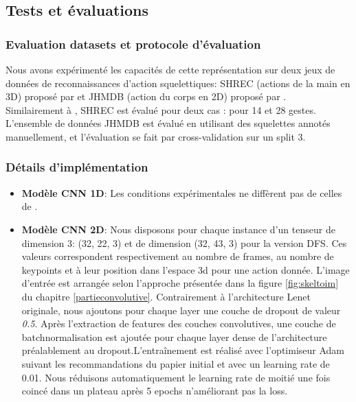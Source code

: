 \subsection{Tests et évaluations}
\label{JHMDBSHREC}
\subsubsection{Evaluation datasets et protocole d'évaluation}

Nous avons expérimenté les capacités de cette représentation sur deux jeux de données de reconnaissances d'action squelettiques: SHREC (actions de la main en 3D) proposé par \cite{de2017shrec} et JHMDB (action du corps en 2D)  proposé par \cite{jhuang2013towards}.\\

Similairement à \cite{2019arXiv190709658Y}, SHREC est évalué pour deux cas : pour 14 et 28 gestes. L'ensemble de données JHMDB est évalué en utilisant des squelettes annotés manuellement, et l'évaluation se fait par cross-validation sur un split 3.

\subsubsection{Détails d'implémentation}

\begin{itemize}
    \item \textbf{Modèle CNN 1D}: Les conditions expérimentales ne diffèrent pas de celles de \cite{2019arXiv190709658Y}.
    \item \textbf{Modèle CNN 2D}: Nous disposons pour chaque instance d'un tenseur de dimension 3: (32, 22, 3) et de dimension (32, 43, 3) pour la version DFS. Ces valeurs correspondent respectivement au nombre de frames, au nombre de keypoints et à leur position dans l'espace 3d pour une action donnée. L'image d'entrée est arrangée selon l'approche présentée dans la figure \ref{fig:skeltoim} du chapitre \ref{partieconvolutive}. \newline Contrairement à l'architecture Lenet \cite{lecun1998gradient} originale, nous ajoutons pour chaque layer une couche de dropout de valeur \textit{0.5}. Après l'extraction de features des couches convolutives, une couche de batchnormalisation est ajoutée pour chaque layer dense de l'architecture préalablement au dropout.\newline L’entraînement est réalisé avec l'optimiseur Adam \cite{kingma2014adam} suivant les recommandations du papier initial et avec un learning rate de 0.01. Nous réduisons automatiquement le learning rate de moitié une fois coincé dans un plateau après 5 epochs n'améliorant pas la loss.
\end{itemize}



